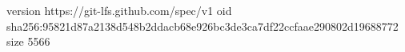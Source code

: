 version https://git-lfs.github.com/spec/v1
oid sha256:95821d87a2138d548b2ddacb68e926bc3de3ca7df22ccfaae290802d19688772
size 5566
